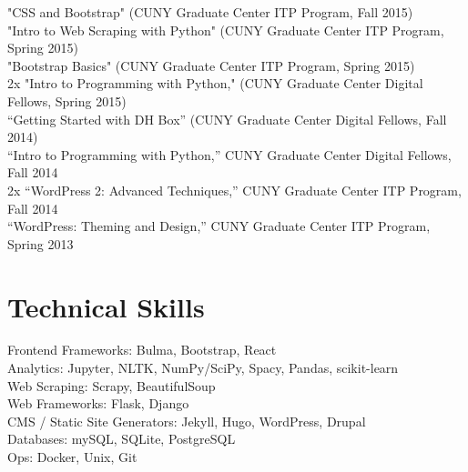 \documentclass[11pt]{article}
\begin{document}
"CSS and Bootstrap" (CUNY Graduate Center ITP Program, Fall 2015)\\
"Intro to Web Scraping with Python" (CUNY Graduate Center ITP Program, Spring 2015)\\
"Bootstrap Basics" (CUNY Graduate Center ITP Program, Spring 2015)\\
2x "Intro to Programming with Python," (CUNY Graduate Center Digital Fellows, Spring 2015)\\
“Getting Started with DH Box” (CUNY Graduate Center Digital Fellows, Fall 2014)\\
“Intro to Programming with Python,” CUNY Graduate Center Digital Fellows, Fall 2014\\
2x “WordPress 2: Advanced Techniques,” CUNY Graduate Center ITP Program, Fall 2014\\
“WordPress: Theming and Design,” CUNY Graduate Center ITP Program, Spring 2013\\

\section*{Technical Skills}
\label{sec:orgheadline13}

Frontend Frameworks: Bulma, Bootstrap, React\\
Analytics: Jupyter, NLTK, NumPy/SciPy, Spacy, Pandas, scikit-learn\\
Web Scraping: Scrapy, BeautifulSoup\\
Web Frameworks: Flask, Django\\
CMS / Static Site Generators: Jekyll, Hugo, WordPress, Drupal\\
Databases: mySQL, SQLite, PostgreSQL\\
Ops: Docker, Unix, Git\\
\end{document}
